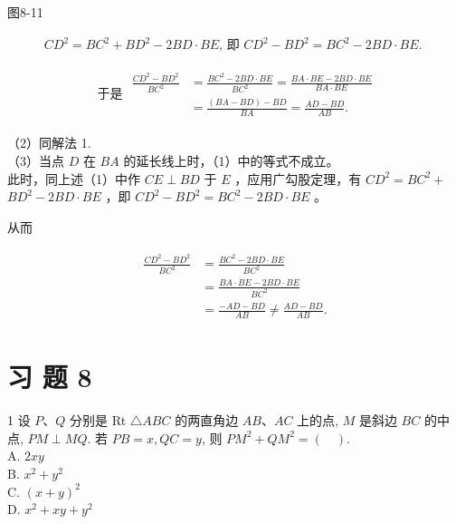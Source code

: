 \documentclass[10pt]{article}
\begin{document}
图8-11

\begin{align*}
C D^{2}=B C^{2}+B D^{2}-2 B D \cdot B E \text {, 即 } C D^{2}-B D^{2}=B C^{2}-2 B D \cdot B E \text {. }
\end{align*}

\begin{align*}
\text { 于是 } \begin{aligned}
\frac{C D^{2}-B D^{2}}{B C^{2}} & =\frac{B C^{2}-2 B D \cdot B E}{B C^{2}}=\frac{B A \cdot B E-2 B D \cdot B E}{B A \cdot B E} \\
& =\frac{(B A-B D)-B D}{B A}=\frac{A D-B D}{A B} .
\end{aligned}
\end{align*}

（2）同解法 1.\\
（3）当点 $D$ 在 $B A$ 的延长线上时，（1）中的等式不成立。\\
此时，同上述（1）中作 $C E \perp B D$ 于 $E$ ，应用广勾股定理，有 $C D^{2}=B C^{2}+$ $B D^{2}-2 B D \cdot B E$ ，即 $C D^{2}-B D^{2}=B C^{2}-2 B D \cdot B E$ 。

从而

\begin{align*}
\begin{aligned}
\frac{C D^{2}-B D^{2}}{B C^{2}} & =\frac{B C^{2}-2 B D \cdot B E}{B C^{2}} \\
& =\frac{B A \cdot B E-2 B D \cdot B E}{B C^{2}} \\
& =\frac{-A D-B D}{A B} \neq \frac{A D-B D}{A B} .
\end{aligned}
\end{align*}

\section*{习 题 8}
1 设 $P 、 Q$ 分别是 Rt $\triangle A B C$ 的两直角边 $A B 、 A C$ 上的点, $M$ 是斜边 $B C$ 的中点, $P M \perp M Q$. 若 $P B=x, Q C=y$, 则 $P M^{2}+Q M^{2}=(\quad)$.\\
A. $2 x y$\\
B. $x^{2}+y^{2}$\\
C. $(x+y)^{2}$\\
D. $x^{2}+x y+y^{2}$
\end{document}
